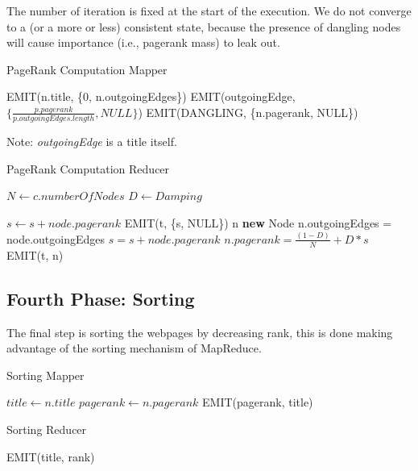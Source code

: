 \noindent The number of iteration is fixed at the start of the execution. We do not converge to a (or a more or less) consistent state, because the presence of dangling nodes will cause importance (i.e., pagerank mass) to leak out.

\begin{algorithm}
	\caption{PageRank Computation Mapper}\label{Mapper}
		\begin{algorithmic}[1]
			
				\State EMIT(n.title, \{0, n.outgoingEdges\})
						\State EMIT(outgoingEdge, $\{\frac{p.pagerank}{p.outgoingEdges.length}, NULL\}$)
					\EndFor
				\Else
					\State EMIT(DANGLING, \{n.pagerank, NULL\})
				\EndIf
			\EndProcedure
	\end{algorithmic}
\end{algorithm}
Note: \textit{outgoingEdge} is a title itself.


\begin{algorithm}[H]
	\caption{PageRank Computation Reducer}\label{Reducer}
		\begin{algorithmic}[1]
				\State $N \gets c.numberOfNodes$
				\State $D \gets Damping$
			\EndProcedure
		
						\State $s \gets s + node.pagerank$	
					\EndFor
					\State EMIT(t, \{s, NULL\})
				\Else
					\State n \textbf{new} Node
							\State n.outgoingEdges = node.outgoingEdges
						\Else
							\State $s = s + node.pagerank$
						\EndIf
					\EndFor
					\State$n.pagerank =  \frac{(1-D)}{N} + D*s$
					\State EMIT(t, n)
				\EndIf
			\EndProcedure
	\end{algorithmic}
\end{algorithm}



\subsection{Fourth Phase: Sorting}
The final step is sorting the webpages by decreasing rank, this is done making advantage of the sorting mechanism of MapReduce.

\begin{algorithm}[H]
	\caption{Sorting Mapper}\label{Mapper}
		\begin{algorithmic}[1]
					\State $title \gets n.title$
					\State $pagerank \gets n.pagerank$
					\State EMIT(pagerank, title)
			\EndProcedure
	\end{algorithmic}
\end{algorithm}

\begin{algorithm}[H]
	\caption{Sorting Reducer}\label{Reducer}
		\begin{algorithmic}[1]
						\State EMIT(title, rank)
					\EndFor
			\EndProcedure
	\end{algorithmic}
\end{algorithm}
